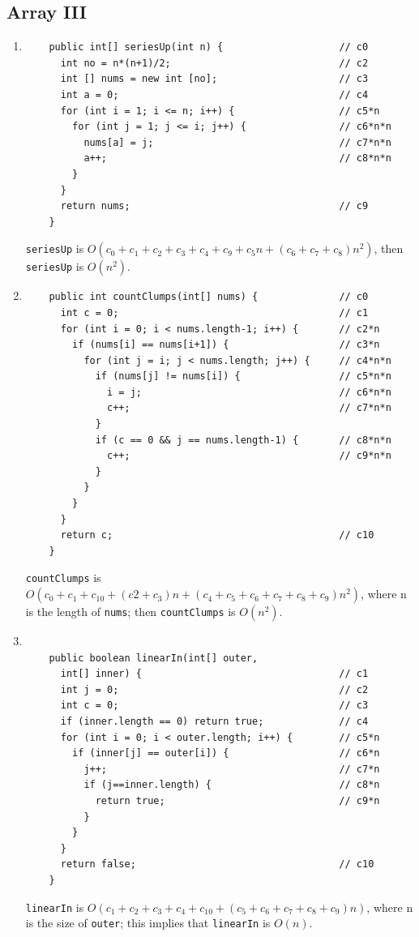 \documentclass[a4paper,12pt]{article}
\begin{document}
  \subsection{Array III}
  \begin{enumerate}
    \item \begin{Verbatim}
    public int[] seriesUp(int n) {                    // c0
      int no = n*(n+1)/2;                             // c2
      int [] nums = new int [no];                     // c3
      int a = 0;                                      // c4
      for (int i = 1; i <= n; i++) {                  // c5*n
        for (int j = 1; j <= i; j++) {                // c6*n*n
          nums[a] = j;                                // c7*n*n
          a++;                                        // c8*n*n
        }
      }
      return nums;                                    // c9
    }
    \end{Verbatim}
    \texttt{seriesUp} is $O(c_0+c_1+c_2+c_3+c_4+c_9+c_5n+(c_6+c_7+c_8)n^2)$,
    then \texttt{seriesUp} is $O(n^2)$.

    \item\begin{Verbatim}
    public int countClumps(int[] nums) {              // c0
      int c = 0;                                      // c1
      for (int i = 0; i < nums.length-1; i++) {       // c2*n
        if (nums[i] == nums[i+1]) {                   // c3*n
          for (int j = i; j < nums.length; j++) {     // c4*n*n
            if (nums[j] != nums[i]) {                 // c5*n*n
              i = j;                                  // c6*n*n
              c++;                                    // c7*n*n
            }
            if (c == 0 && j == nums.length-1) {       // c8*n*n
              c++;                                    // c9*n*n
            }
          }
        }
      }
      return c;                                       // c10
    }
    \end{Verbatim}
    \texttt{countClumps} is $O(c_0+c_1+c_10+(c2+c_3)n+(c_4+c_5+c_6+c_7+c_8+c_9)n^2)$, where n is the length of \texttt{nums};
    then \texttt{countClumps} is $O(n^2)$.
    \item \begin{Verbatim}

    public boolean linearIn(int[] outer,
      int[] inner) {                                  // c1
      int j = 0;                                      // c2
      int c = 0;                                      // c3
      if (inner.length == 0) return true;             // c4
      for (int i = 0; i < outer.length; i++) {        // c5*n
        if (inner[j] == outer[i]) {                   // c6*n
          j++;                                        // c7*n
          if (j==inner.length) {                      // c8*n
            return true;                              // c9*n
          }
        }
      }
      return false;                                   // c10
    }
    \end{Verbatim}
    \texttt{linearIn} is $O(c_1+c_2+c_3+c_4+c_10+(c_5+c_6+c_7+c_8+c_9)n)$, where n is the size of \texttt{outer};
    this implies that \texttt{linearIn} is $O(n)$.


\end{enumerate}
\end{document}
